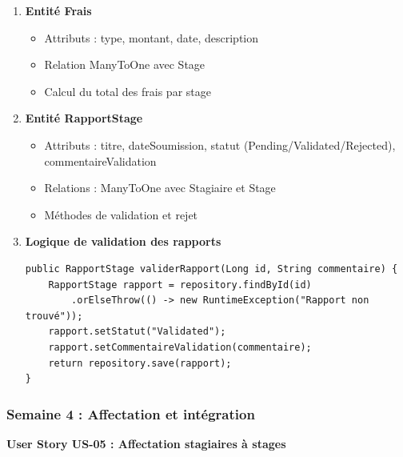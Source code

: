 \documentclass[12pt,a4paper]{report}
\begin{document}
\begin{enumerate}[leftmargin=1cm]
    \item \textbf{Entité Frais}
    \begin{itemize}
        \item Attributs : type, montant, date, description
        \item Relation ManyToOne avec Stage
        \item Calcul du total des frais par stage
    \end{itemize}
    
    \item \textbf{Entité RapportStage}
    \begin{itemize}
        \item Attributs : titre, dateSoumission, statut (Pending/Validated/Rejected), commentaireValidation
        \item Relations : ManyToOne avec Stagiaire et Stage
        \item Méthodes de validation et rejet
    \end{itemize}
    
    \item \textbf{Logique de validation des rapports}
    \begin{lstlisting}[caption={Validation dans RapportStageService.java}]
public RapportStage validerRapport(Long id, String commentaire) {
    RapportStage rapport = repository.findById(id)
        .orElseThrow(() -> new RuntimeException("Rapport non trouvé"));
    rapport.setStatut("Validated");
    rapport.setCommentaireValidation(commentaire);
    return repository.save(rapport);
}
\end{lstlisting}
\end{enumerate}

\subsubsection{Semaine 4 : Affectation et intégration}

\textbf{User Story US-05 : Affectation stagiaires à stages}
\end{document}
